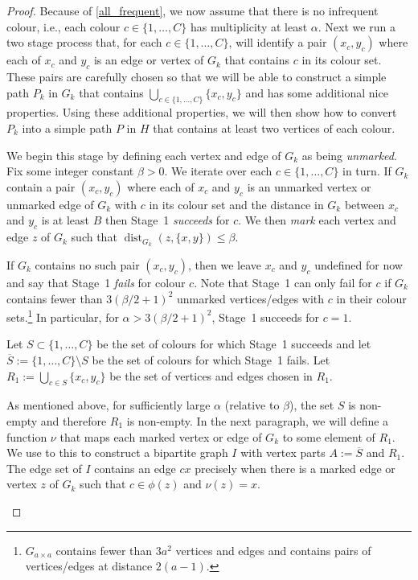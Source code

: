 \documentclass{patmorin}
\DeclareMathOperator{\dist}{dist}
\begin{document}
\begin{proof}
  Because of \cref{all_frequent}, we now assume that there is no infrequent colour, i.e., each colour $c\in\{1,\ldots,C\}$ has multiplicity at least $\alpha$.  Next we run a two stage process that, for each $c\in\{1,\ldots,C\}$, will identify a pair $(x_c,y_c)$ where each of $x_c$ and $y_c$ is an edge or vertex of $G_k$ that contains $c$ in its colour set.  These pairs are carefully chosen so that we will be able to construct a simple path $P_k$ in $G_k$ that contains $\bigcup_{c\in\{1,\ldots,C\}} \{x_c,y_c\}$ and has some additional nice properties.  Using these additional properties, we will then show how to convert $P_k$ into a simple path $P$ in $H$ that contains at least two vertices of each colour.

  \begin{compactenum}[{Stage} 1:]
    \item We begin this stage by defining each vertex and edge of $G_k$ as being \emph{unmarked}.  Fix some integer constant $\beta>0$.  We iterate over each $c\in\{1,\ldots,C\}$ in turn.  If $G_k$ contain a pair $(x_c,y_c)$ where each of $x_c$ and $y_c$ is an unmarked vertex or unmarked edge of $G_k$ with $c$ in its colour set and the distance in $G_k$ between $x_c$ and $y_c$ is at least $B$ then Stage~1 \emph{succeeds} for $c$.  We then \emph{mark} each vertex and edge $z$ of $G_k$ such that $\dist_{G_k}(z, \{x,y\})\le \beta$.

    If $G_k$ contains no such pair $(x_c,y_c)$, then we leave $x_c$ and $y_c$ undefined for now and say that Stage~1 \emph{fails} for colour $c$.  Note that Stage~1 can only fail for $c$ if $G_k$ contains fewer than $3(\beta/2+1)^2$ unmarked vertices/edges with $c$ in their colour sets.\footnote{$G_{a\times a}$ contains fewer than $3a^2$ vertices and edges and contains pairs of vertices/edges at distance $2(a-1)$.}  In particular, for $\alpha > 3(\beta/2+1)^2$, Stage~1 succeeds for $c=1$.

    \item Let $S\subset\{1,\ldots,C\}$ be the set of colours for which Stage~1 succeeds and let $\overline{S}:=\{1,\ldots,C\}\setminus S$ be the set of colours for which Stage~1 fails.  Let $R_1:=\bigcup_{c\in S}\{x_c,y_c\}$ be the set of vertices and edges chosen in $R_1$.
    
    As mentioned above, for sufficiently large $\alpha$ (relative to $\beta$), the set $S$ is non-empty and therefore $R_1$ is non-empty. In the next paragraph, we will define a function $\nu$ that maps each marked vertex or edge of $G_k$ to some element of $R_1$.  We use to this to construct a bipartite graph $I$ with vertex parts $A:=\overline{S}$ and $R_1$. The edge set of $I$ contains an edge $cx$ precisely when there is a marked edge or vertex $z$ of $G_k$ such that $c\in\phi(z)$ and $\nu(z)=x$.


\end{compactenum}
\end{proof}
\end{document}
